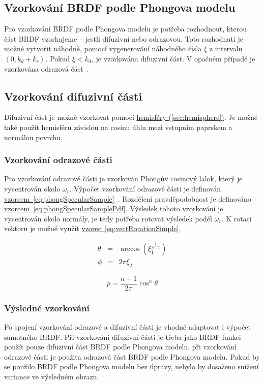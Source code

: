 \documentclass[czech,master]{diploma}
\newcommand{\intervalcc}[2]{\left<{{#1},{#2}}\right>}
\newcommand{\refl}{\omega_{r}}
\newcommand{\randU}{\xi_{1}}
\newcommand{\randV}{\xi_{2}}
\begin{document}
\subsection{Vzorkování BRDF podle Phongova modelu} \label{sec:phongSampling}
Pro vzorkování BRDF podle Phongova modelu je potřeba rozhodnout, kterou část BRDF vzorkujeme -- jestli difuzivní nebo odrazovou. Toto rozhodnutí je možné vytvořit náhodně, pomocí vygenerování náhodného čísla \(\xi\) z intervalu \(\intervalcc{0}{k_d+k_s}\). Pokud \(\xi < k_d\), je vzorkována difuzivní část. V opačném případě je vzorkována odrazová část~\cite{KrivanekBRDFIBL}.
\subsection{Vzorkování difuzivní části}
Difuzivní část je možné vzorkovat pomocí \hyperref[sec:hemisphere]{hemisféry (\ref{sec:hemisphere})}. Je možné také použít hemisféru závislou na cosinu úhlu mezi vstupním paprskem a normálou povrchu.

\subsubsection*{Vzorkování odrazové části}
Pro vzorkování odrazové části je vzorkován Phongův cosinový lalok, který je vycentrován okolo \(\refl\). Výpočet vzorkování odrazové části je definován \hyperref[eq:phongSpecularSample]{vzorcem~\ref{eq:phongSpecularSample}}~\cite{KrivanekBRDFIBL}. Rozdělení pravděpodobnost je definováno \hyperref[eq:phongSpecularSamplePdf]{vzorcem~\ref{eq:phongSpecularSamplePdf}}.
Výsledek tohoto vzorkování je vycentrován okolo normály, je tedy potřeba rotovat výsledek podél \(\refl\). K rotaci vektoru je možné využít \hyperref[eq:vectRotationSimple]{vzorec~\ref{eq:vectRotationSimple}}.

\begin{eqnarray}
  \theta & = & \arccos(\randU^{\frac{1}{n+1}}) \nonumber \\
  \phi & = & 2\pi\randV\label{eq:phongSpecularSample}
\end{eqnarray}

\begin{equation} \label{eq:phongSpecularSamplePdf}
  p = \frac{n+1}{2\pi}\cos^n\theta
\end{equation}

\subsubsection*{Výsledné vzorkování}
Po spojení vzorkování odrazové a difuzivní části je vhodné adaptovat i výpočet samotného BRDF\@. Při vzorkování difuzivní části je třeba jako BRDF funkci použít pouze difuzivní část BRDF podle Phongova modelu, při vzorkování odrazové části je použita odrazová část BRDF podle Phongova modelu\@. Pokud by se použilo BRDF podle Phongova modelu bez úpravy, nebylo by dosaženo snížení variance ve výsledném obrazu.~\cite{KrivanekBRDFIBL}
\end{document}

